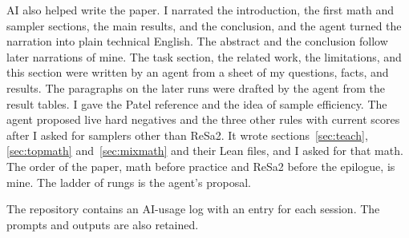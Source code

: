 \documentclass[11pt]{article}
\theoremstyle{definition}
\begin{document}
AI also helped write the paper. I narrated the introduction, the first math and sampler sections, the main results, and the conclusion, and the agent turned the narration into plain technical English. The abstract and the conclusion follow later narrations of mine. The task section, the related work, the limitations, and this section were written by an agent from a sheet of my questions, facts, and results. The paragraphs on the later runs were drafted by the agent from the result tables. I gave the Patel reference and the idea of sample efficiency. The agent proposed live hard negatives and the three other rules with current scores after I asked for samplers other than ReSa2. It wrote sections~\ref{sec:teach}, \ref{sec:topmath} and~\ref{sec:mixmath} and their Lean files, and I asked for that math. The order of the paper, math before practice and ReSa2 before the epilogue, is mine. The ladder of rungs is the agent's proposal.

The repository contains an AI-usage log with an entry for each session. The prompts and outputs are also retained.
\end{document}
